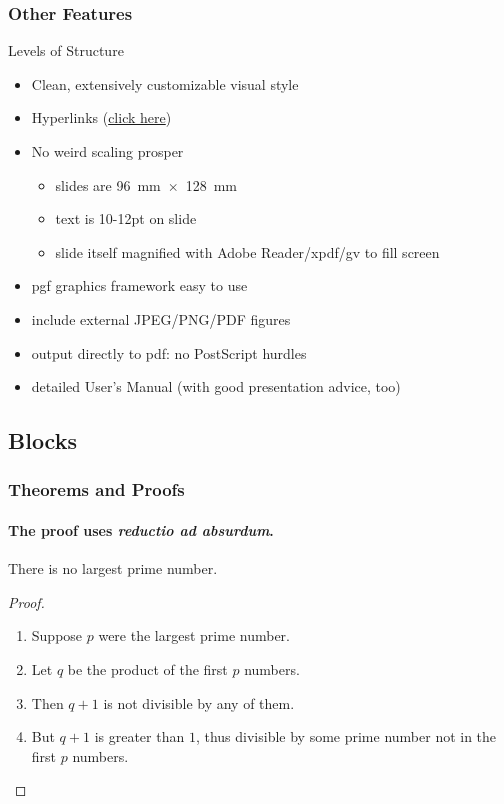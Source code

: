 \documentclass[11pt]{beamer}
\begin{document}
\begin{frame}
  \frametitle{Other Features}

  \begin{block}{Levels of Structure}
    \begin{itemize}
    \item Clean, extensively customizable visual style
    \item Hyperlinks (\href{http://github.com/izahn/iqss-beamer-theme}{click here}) 
      \item No weird scaling prosper
      \begin{itemize}
        \item slides are 96~mm~$\times$~128~mm
        
        \item text is 10-12pt on slide
        
        \item slide itself magnified with Adobe Reader/xpdf/gv to fill screen
      \end{itemize}
      
      \item pgf graphics framework easy to use
      
      \item include external JPEG/PNG/PDF figures
      
      \item output directly to pdf: no PostScript hurdles
      
      \item detailed User's Manual (with good presentation advice, too)
    \end{itemize}
  \end{block}
\end{frame}

\subsection{Blocks}

\begin{frame}
\frametitle{Theorems and Proofs}
\framesubtitle{The proof uses \textit{reductio ad absurdum}.}
\begin{theorem}
There is no largest prime number.
\end{theorem}
\begin{proof}
\begin{enumerate}
\item<1-| alert@1> Suppose $p$ were the largest prime number.
\item<2-> Let $q$ be the product of the first $p$ numbers.
\item<3-> Then $q+1$ is not divisible by any of them.
\item<1-> But $q + 1$ is greater than $1$, thus divisible by some prime
number not in the first $p$ numbers.\qedhere
\end{enumerate}
\end{proof}
\end{frame}
\end{document}
